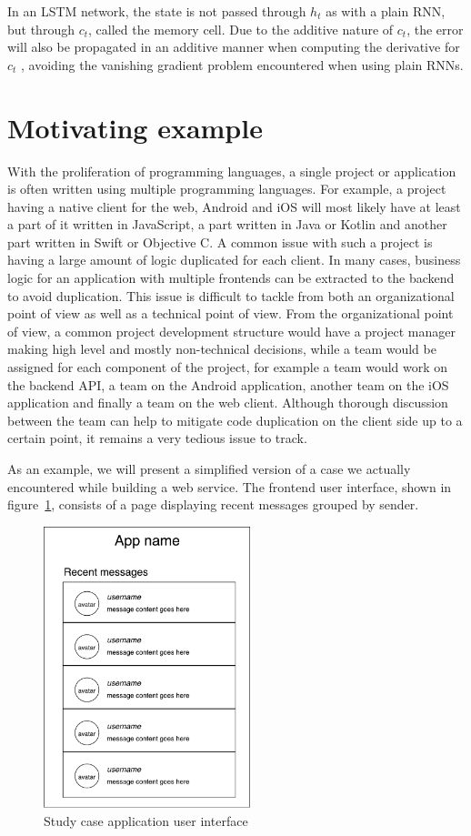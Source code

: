 In an LSTM network, the state is not passed through $h_t$ as with a plain RNN,
but through $c_t$, called the memory cell. Due to the additive nature of $c_t$,
the error will also be propagated in an additive manner when computing the
derivative for $c_t$ \cite{Hochreiter:1997:LSM:1246443.1246450}, avoiding the
vanishing gradient problem encountered when using plain RNNs.
%
\section{Motivating example}
With the proliferation of programming languages, a single project or application
is often written using multiple programming languages. For example, a project
having a native client for the web, Android and iOS will most likely have at
least a part of it written in JavaScript, a part written in Java or Kotlin and
another part written in Swift or Objective C. A common issue with such a project
is having a large amount of logic duplicated for each client. In many cases,
business logic for an application with multiple frontends can be extracted to
the backend to avoid duplication. This issue is difficult to tackle from both an
organizational point of view as well as a technical point of view.
From the organizational point of view, a common project development structure
would have a project manager making high level and mostly non-technical
decisions, while a team would be assigned for each component of the project, for
example a team would work on the backend API, a team on the Android application,
another team on the iOS application and finally a team on the web client.
Although thorough discussion between the team can help to mitigate code
duplication on the client side up to a certain point, it remains a very tedious
issue to track.

As an example, we will present a simplified version of a case we actually
encountered while building a web service. The frontend user interface, shown in
figure~\ref{fig:app-messages-screen}, consists of a page displaying recent
messages grouped by sender.

\begin{figure}[tb]
  \centering\includegraphics[width=6cm]{./images/app-messages-screen.pdf}
  \caption{\label{fig:app-messages-screen} Study case application user interface}
\end{figure}

